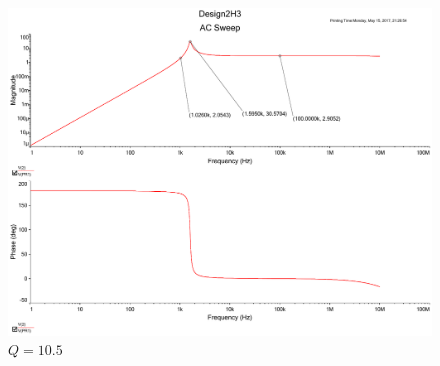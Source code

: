\documentclass[UTF8,a4paper]{paper}
\begin{document}
\begin{figure}
\centering
\includegraphics[width=\textwidth]{2H10_5.pdf}
\caption{$Q=10.5$}
\label{HQ10}
\end{figure}
\clearpage
\end{document}
